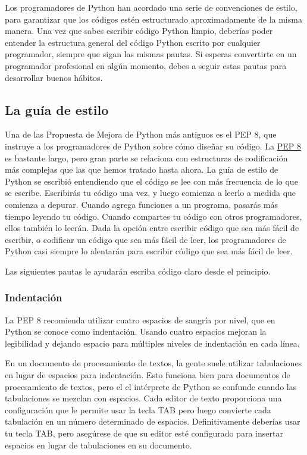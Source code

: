 Los programadores de Python han acordado una serie de convenciones de estilo, para garantizar que los códigos estén estructurado aproximadamente de la misma manera. Una vez que sabes escribir código Python limpio, deberías poder entender la estructura general
del código Python escrito por cualquier programador, siempre que sigan las mismas pautas.  Si esperas convertirte en un programador profesional en algún momento, debes a seguir estas pautas para desarrollar buenos hábitos.

\subsection{La guía de estilo}\label{PEP}

Una de las  Propuesta de Mejora de Python más antiguos es el PEP 8, que instruye a los programadores de Python sobre cómo diseñar su código. La \href{https://peps.python.org/pep-0008/}{\color{vino}PEP 8} es bastante largo, pero gran parte se relaciona con estructuras de codificación más complejas que las que hemos tratado hasta ahora.  La guía de estilo de Python se escribió entendiendo que el código se lee con más frecuencia de lo que se escribe. Escribirás tu código una vez, y luego comienza a leerlo a medida que comienza a depurar. Cuando agrega funciones a un programa, pasarás más tiempo leyendo tu código. Cuando compartes tu código con otros programadores, ellos también lo leerán. Dada la opción entre escribir código que sea más fácil de escribir, o codificar
un código  que sea más fácil de leer, los programadores de Python casi siempre lo alentarán para escribir código que sea más fácil de leer.

Las siguientes pautas le ayudarán escriba código claro desde el principio.

\subsubsection{Indentación}

La PEP 8 recomienda utilizar cuatro espacios de sangría por nivel, que en Python se conoce como indentación. Usando
cuatro espacios mejoran la legibilidad y dejando espacio para múltiples niveles de indentación en cada línea.


En un documento de procesamiento de textos, la gente suele utilizar tabulaciones en lugar de
espacios para indentación. Esto funciona bien para documentos de procesamiento de textos, pero el
el intérprete de Python se confunde cuando las tabulaciones se mezclan con espacios. 
Cada  editor de texto proporciona una configuración que le permite usar la tecla TAB pero luego convierte
cada tabulación  en un número determinado de espacios. Definitivamente deberías usar tu tecla TAB,
pero asegúrese de que su editor esté configurado para insertar espacios en lugar de tabulaciones en
su documento.

